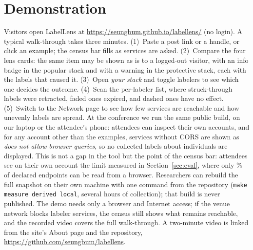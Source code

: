 \section{Demonstration}
\label{sec:demo}
Visitors open LabelLens at \url{https://seungbum.github.io/labellens/} (no login). A typical walk-through takes three minutes. (1)~Paste a post link or a handle, or click an example; the census bar fills as \labValidEndpoint services are asked. (2)~Compare the four lens cards: the same item may be shown as is to a logged-out visitor, with an info badge in the popular stack and with a warning in the protective stack, each with the labels that caused it. (3)~Open \emph{your stack} and toggle labelers to see which one decides the outcome. (4)~Scan the per-labeler list, where struck-through labels were retracted, faded ones expired, and dashed ones have no effect. (5)~Switch to the Network page to see how few services are reachable and how unevenly labels are spread. At the conference we run the same public build, on our laptop or the attendee's phone: attendees can inspect their own accounts, and for any account other than the examples, services without CORS are shown as \emph{does not allow browser queries}, so no collected labels about individuals are displayed. This is not a gap in the tool but the point of the census bar: attendees see on their own account the limit measured in Section~\ref{sec:eval}, where only \labBrowserPctOfEndpoint\% of declared endpoints can be read from a browser. Researchers can rebuild the full snapshot on their own machine with one command from the repository (\texttt{make measure derived local}, several hours of collection); that build is never published. The demo needs only a browser and Internet access; if the venue network blocks labeler services, the census still shows what remains reachable, and the recorded video covers the full walk-through. A two-minute video is linked from the site's About page and the repository, \url{https://github.com/seungbum/labellens}.
